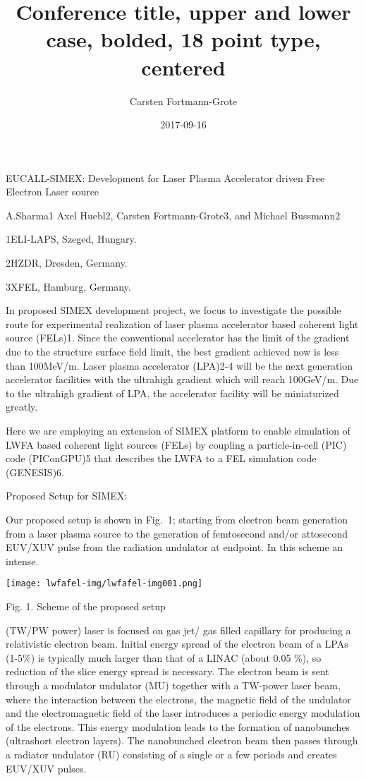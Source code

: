 \documentclass{article}
\title{Conference title, upper and lower case, bolded, 18 point type, centered}
\author{Carsten Fortmann-Grote}
\date{2017-09-16}
\begin{document}
EUCALL-SIMEX: Development for Laser Plasma Accelerator driven Free Electron
Laser source 

A.Sharma1 Axel Huebl2, Carsten Fortmann-Grote3, and Michael Bussmann2

1ELI-LAPS, Szeged, Hungary.

2HZDR, Dresden, Germany.

3XFEL, Hamburg, Germany.


\bigskip


\bigskip


\bigskip

In proposed SIMEX development project, we focus to investigate the possible
route for experimental realization of laser plasma accelerator based coherent
light source (FELs)1. Since the conventional accelerator has the limit of the
gradient due to the structure surface field limit, the best gradient achieved
now is less than 100MeV/m. Laser plasma accelerator (LPA)2-4 will be the next
generation accelerator facilities with the ultrahigh gradient which will reach
100GeV/m. Due to the ultrahigh gradient of LPA, the accelerator facility will
be miniaturized greatly. 

Here we are employing an extension of SIMEX platform to enable simulation of
LWFA based coherent light sources (FELs) by coupling a particle-in-cell (PIC)
code (PIConGPU)5 that describes the LWFA to a FEL simulation code (GENESIS)6.


\bigskip

Proposed Setup for SIMEX:

Our proposed setup is shown in Fig.~1; starting from electron beam generation
from a laser plasma source to the generation of femtosecond and/or attosecond
EUV/XUV pulse from the radiation undulator at endpoint. In this scheme an
intense. 


\bigskip


\texttt{[image: lwfafel-img/lwfafel-img001.png]}


Fig. 1. Scheme of the proposed setup


\bigskip

(TW/PW power) laser is focused on gas jet/ gas filled capillary for producing a
relativistic electron beam. Initial energy spread of the electron beam of a
LPAs (1-5\%) is typically much larger than that of a LINAC (about 0.05 \%), so
reduction of the slice energy spread is necessary. The electron beam is sent
through a modulator undulator (MU) together with a TW-power laser beam, where
the interaction between the electrons, the magnetic field of the undulator and
the electromagnetic field of the laser introduces a periodic energy modulation
of the electrons. This energy modulation leads to the formation of nanobunches
(ultrashort electron layers). The nanobunched electron beam then passes through
a radiator undulator (RU) consisting of a single or a few periods and creates
EUV/XUV pulses.
\end{document}
